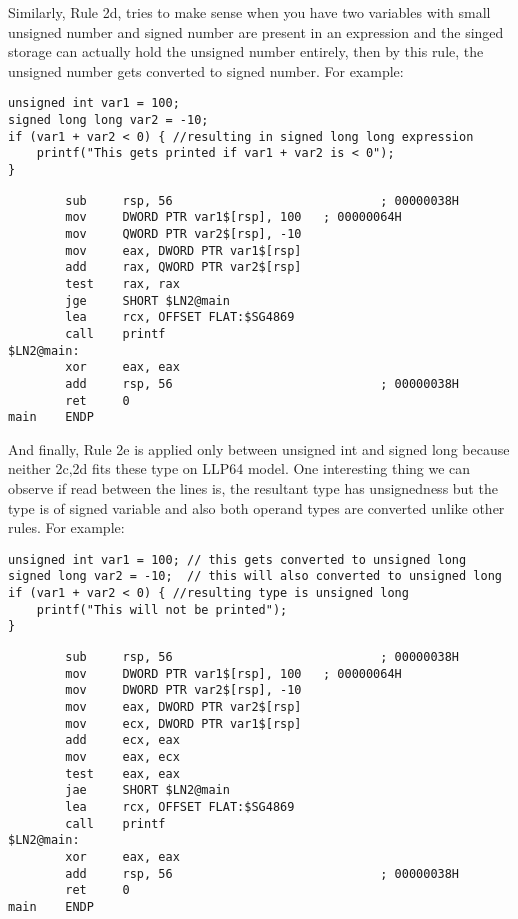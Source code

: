 \documentclass{article}
\begin{document}
Similarly, Rule 2d, tries to make sense when you have two variables with small
unsigned number and signed number are present in an expression and the
singed storage can actually hold the unsigned number entirely, then by this
rule, the unsigned number gets converted to signed number.
For example: 
\begin{verbatim}
unsigned int var1 = 100;
signed long long var2 = -10;
if (var1 + var2 < 0) { //resulting in signed long long expression
    printf("This gets printed if var1 + var2 is < 0");
}
\end{verbatim}
\begin{verbatim}
        sub     rsp, 56                             ; 00000038H
        mov     DWORD PTR var1$[rsp], 100   ; 00000064H
        mov     QWORD PTR var2$[rsp], -10
        mov     eax, DWORD PTR var1$[rsp]
        add     rax, QWORD PTR var2$[rsp]
        test    rax, rax
        jge     SHORT $LN2@main
        lea     rcx, OFFSET FLAT:$SG4869
        call    printf
$LN2@main:
        xor     eax, eax
        add     rsp, 56                             ; 00000038H
        ret     0
main    ENDP
\end{verbatim}

And finally, Rule 2e is applied only between unsigned int and signed long
because neither 2c,2d fits these type on LLP64 model. One interesting thing we
can observe if read between the lines is, the resultant type has unsignedness
but the type is of signed variable and also both operand types are converted
unlike other rules.
For example:
\begin{verbatim}
unsigned int var1 = 100; // this gets converted to unsigned long
signed long var2 = -10;  // this will also converted to unsigned long
if (var1 + var2 < 0) { //resulting type is unsigned long
    printf("This will not be printed");
}
\end{verbatim}
\begin{verbatim}
        sub     rsp, 56                             ; 00000038H
        mov     DWORD PTR var1$[rsp], 100   ; 00000064H
        mov     DWORD PTR var2$[rsp], -10
        mov     eax, DWORD PTR var2$[rsp]
        mov     ecx, DWORD PTR var1$[rsp]
        add     ecx, eax
        mov     eax, ecx
        test    eax, eax
        jae     SHORT $LN2@main
        lea     rcx, OFFSET FLAT:$SG4869
        call    printf
$LN2@main:
        xor     eax, eax
        add     rsp, 56                             ; 00000038H
        ret     0
main    ENDP
\end{verbatim}
\end{document}
